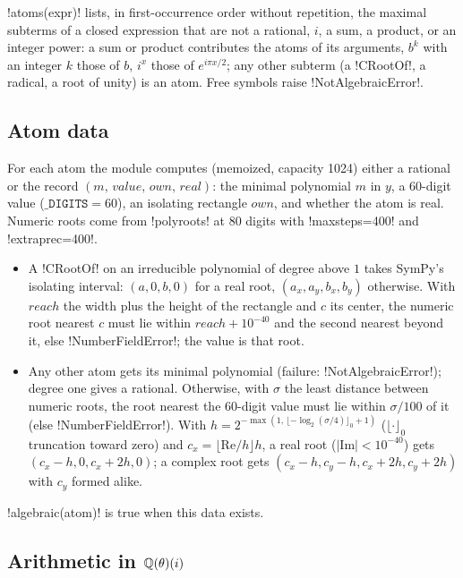 \begin{definition}\label{def:algebra-nf-atoms}
\py!atoms(expr)! lists, in first-occurrence order without repetition, the maximal subterms of a closed expression that are not a rational, $i$, a sum, a product, or an integer power: a sum or product contributes the atoms of its arguments, $b^k$ with an integer $k$ those of $b$, $i^x$ those of $e^{i\pi x/2}$; any other subterm (a \py!CRootOf!, a radical, a root of unity) is an atom. Free symbols raise \py!NotAlgebraicError!.
\end{definition}

\subsection{Atom data}

For each atom the module computes (memoized, capacity 1024) either a rational or the record $(m,\,\mathit{value},\,\mathit{own},\,\mathit{real})$: the minimal polynomial $m$ in $y$, a 60-digit value ($\mathtt{\_DIGITS}=60$), an isolating rectangle $\mathit{own}$, and whether the atom is real. Numeric roots come from  \py!polyroots! at $80$ digits with \code!maxsteps=400! and \code!extraprec=400!.
\begin{itemize}
\item A \py!CRootOf! on an irreducible polynomial of degree above $1$ takes SymPy's isolating interval: $(a,0,b,0)$ for a real root, $(a_x,a_y,b_x,b_y)$ otherwise. With $\mathit{reach}$ the width plus the height of the rectangle and $c$ its center, the numeric root nearest $c$ must lie within $\mathit{reach}+10^{-40}$ and the second nearest beyond it, else \py!NumberFieldError!; the value is that root.
\item Any other atom gets its minimal polynomial (failure: \py!NotAlgebraicError!); degree one gives a rational. Otherwise, with $\sigma$ the least distance between numeric roots, the root nearest the 60-digit value must lie within $\sigma/100$ of it (else \py!NumberFieldError!). With $h=2^{-\max(1,\,\lfloor-\log_2(\sigma/4)\rfloor_0+1)}$ ($\lfloor\cdot\rfloor_0$ truncation toward zero) and $c_x=\lfloor\mathrm{Re}/h\rfloor h$, a real root ($|\mathrm{Im}|<10^{-40}$) gets $(c_x-h,0,c_x+2h,0)$; a complex root gets $(c_x-h,c_y-h,c_x+2h,c_y+2h)$ with $c_y$ formed alike.
\end{itemize}
\py!algebraic(atom)! is true when this data exists.

\subsection{Arithmetic in \texorpdfstring{$\mathbb{Q}(\theta)(i)$}{Q(θ)(i)}}


